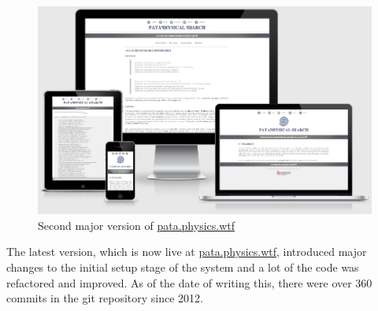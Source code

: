 \begin{figure}[!htbp] %
  \centering
  \includegraphics[width=\linewidth]{images/proto2screen}
\caption[Second major version of \url{pata.physics.wtf}]{Second major version of \url{pata.physics.wtf}}
\label{img:proto2screen}
\end{figure}

The latest version, which is now live at \url{pata.physics.wtf}, introduced major changes to the initial setup stage of the system and a lot of the code was refactored and improved. As of the date of writing this, there were over 360 commits in the git repository since 2012.


\stopcontents[chapters]
